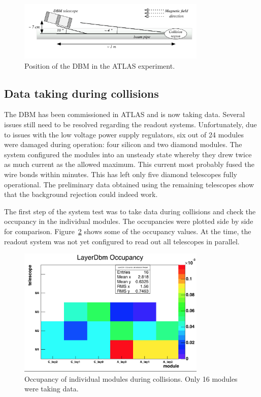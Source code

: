 \begin{figure}[!t]
\centering
\includegraphics[width=0.8\textwidth]{../scripts/04_charge_monitoring/plots/DBM-positioning}
\caption{Position of the DBM in the ATLAS experiment.}
\label{fig:dbminatlas}
\end{figure}



\subsection{Data taking during collisions}
The DBM has been commissioned in ATLAS and is now taking data. Several issues still need to be resolved regarding the readout systems. Unfortunately, due to issues with the low voltage power supply regulators, six out of 24 modules were damaged during operation: four silicon and two diamond modules. The system configured the modules into an unsteady state whereby they drew twice as much current as the allowed maximum. This current most probably fused the wire bonds within minutes. This has left only five diamond telescopes fully operational. The preliminary data obtained using the remaining telescopes show that the background rejection could indeed work. 

The first step of the system test was to take data during collisions and check the occupancy in the individual modules. The occupancies were plotted side by side for comparison. Figure~\ref{fig:collocc} shows some of the occupancy values. At the time, the readout system was not yet configured to read out all telescopes in parallel. 
\begin{figure}[!t]
\centering
\includegraphics[width=0.8\textwidth]{04_charge_monitoring/pics/occupancy}
\caption{Occupancy of individual modules during collisions. Only 16 modules were taking data.}
\label{fig:collocc}
\end{figure}

